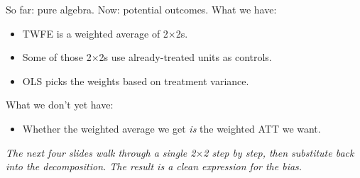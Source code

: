\documentclass[aspectratio=169,11pt]{beamer}
\begin{document}
\begin{frame}{So far: pure algebra. Now: potential outcomes.}
\vspace{0.5em}
What we have:
\begin{itemize}\small
  \item TWFE is a weighted average of 2$\times$2s.
  \item Some of those 2$\times$2s use already-treated units as controls.
  \item OLS picks the weights based on treatment variance.
\end{itemize}

\vspace{0.5em}
What we don't yet have:
\begin{itemize}\small
  \item Whether the weighted average we get \textit{is} the weighted ATT we want.
\end{itemize}

\vspace{0.6em}

\vspace{0.5em}
\begin{center}
\small\color{warmgray}\itshape
The next four slides walk through a single 2$\times$2 step by step, then substitute back into the decomposition. The result is a clean expression for the bias.
\end{center}
\end{frame}

\end{document}
